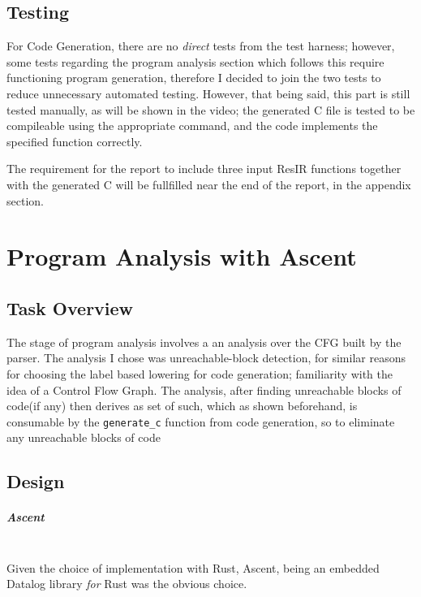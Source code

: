\documentclass[11pt,a4paper,oneside]{report}
\begin{document}
	
	\section{Testing}
	
	\begin{testbox}
		For Code Generation, there are no \textit{direct} tests from the test harness; however, some tests regarding the program analysis section which follows this require functioning program generation, therefore I decided to join the two tests to reduce unnecessary automated testing. However, that being said, this part is still tested manually, as will be shown in the video; the generated C file is tested to be compileable using the appropriate command, and the code implements the specified function correctly.  
	\end{testbox}
	
	\begin{designbox}
		The requirement for the report to include three input ResIR functions together with the generated C will be fullfilled near the end of the report, in the appendix section. 
	\end{designbox}
	
	\chapter{Program Analysis with Ascent}
	\section{Task Overview}
	The stage of program analysis involves a an analysis over the CFG built by the parser. The analysis I chose was unreachable-block detection, for similar reasons for choosing the label based lowering for code generation; familiarity with the idea of a Control Flow Graph. The analysis, after finding unreachable blocks of code(if any) then derives as set of such, which as shown beforehand, is consumable by the \texttt{generate\_c} function from code generation, so to eliminate any unreachable blocks of code
	
	
	\section{Design}
	\paragraph{Ascent}\mbox{}\\
	Given the choice of implementation with Rust, Ascent, being an embedded Datalog library \textit{for} Rust was the obvious choice. 
	
\end{document}
